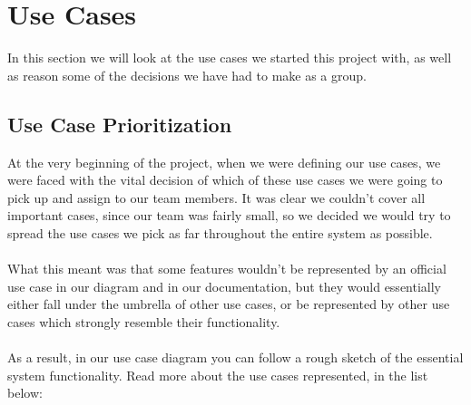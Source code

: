 \section{Use Cases}
In this section we will look at the use cases we started this project with, as well as reason some of the decisions we have had to make as a group.
\subsection{Use Case Prioritization}
At the very beginning of the project, when we were defining our use cases, we were faced with the vital decision of which of these use cases we were going to pick up and assign to our team members. It was clear we couldn't cover all important cases, since our team was fairly small, so we decided we would try to spread the use cases we pick as far throughout the entire system as possible. 
\\ \\
What this meant was that some features wouldn't be represented by an official use case in our diagram and in our documentation, but they would essentially either fall under the umbrella of other use cases, or be represented by other use cases which strongly resemble their functionality.
\\ \\
As a result, in our use case diagram you can follow a rough sketch of the essential system functionality. Read more about the use cases represented, in the list below:

